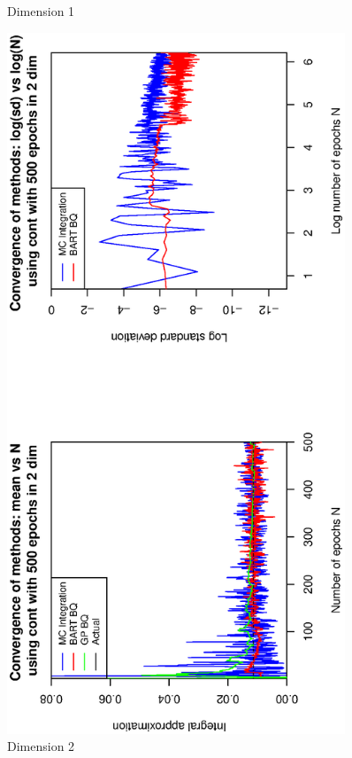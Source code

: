 \begin{figure}[H]
\begin{minipage}[b]{0.4\textwidth}
     \vspace{-1.3cm}
     \caption{Dimension 1}
  \end{minipage}
    \hspace{1.8cm}
  \begin{minipage}[b]{0.4\textwidth}
  \captionsetup{justification=centering}
    \includegraphics[width= 0.90\textwidth, angle = -90]{report/Figures/1/convergenceMean12Dimensions.eps}
    \vspace{-1.3cm}
    \caption{Dimension 2}
  \end{minipage}
\end{figure}
\vspace{-1.3cm}


